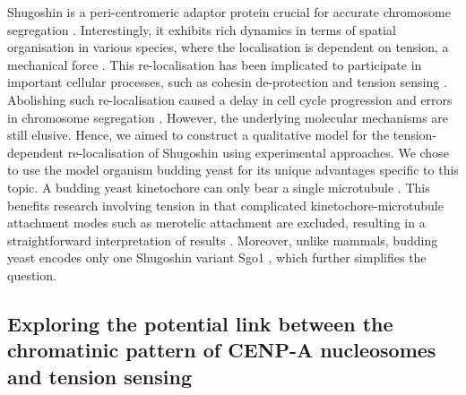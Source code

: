 Shugoshin is a peri-centromeric adaptor protein crucial for accurate chromosome segregation \citep{Marston2015, Zhang2020FunctioningMitosis}. Interestingly, it exhibits rich dynamics in terms of spatial organisation in various species, where the localisation is dependent on tension, a mechanical force \citep{Huang2007, Lee2008, Liu2013, Asai2020, Lee2008, Gomez2007, Eshleman2014, Nerusheva2014, Paldi2020ConvergentPericentromeres, Clarke2005, Kawashima2007}. This re-localisation has been implicated to participate in important cellular processes, such as cohesin de-protection and tension sensing \citep{Indjeian2005a, Nerusheva2014, Su2021SumoylationAnaphase, Lee2008, Liu2013}. Abolishing such re-localisation caused a delay in cell cycle progression and errors in chromosome segregation \citep{Su2021SumoylationAnaphase, Liu2013}. However, the underlying molecular mechanisms are still elusive. Hence, we aimed to construct a qualitative model for the tension-dependent re-localisation of Shugoshin using experimental approaches. We chose to use the model organism budding yeast for its unique advantages specific to this topic. A budding yeast kinetochore can only bear a single microtubule \citep{Biggins2013TheKinetochore}. This benefits research involving tension in that complicated kinetochore-microtubule attachment modes such as merotelic attachment are excluded, resulting in a straightforward interpretation of results \citep{Tanaka2010Kinetochore-microtubuleBi-orientation}. Moreover, unlike mammals, budding yeast encodes only one Shugoshin variant Sgo1 \citep{Marston2015}, which further simplifies the question. 

\subsection{Exploring the potential link between the chromatinic pattern of CENP-A nucleosomes and tension sensing}

